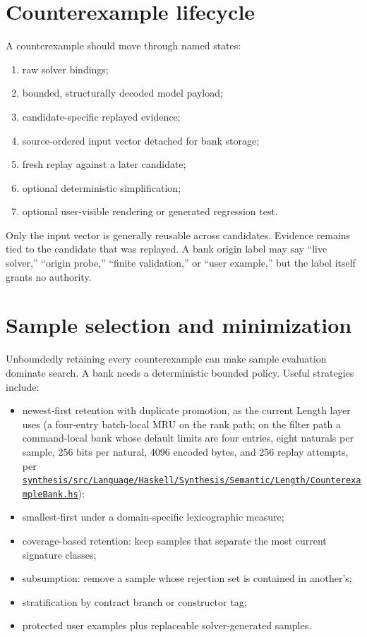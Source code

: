 \documentclass[10pt,letterpaper,oneside]{report}
\def\DjexPinnedCommit{7d65eba6f753727ae7b3d734fb4a7e00f1f44aa7}
\def\DjexBase{https://github.com/VladimirReshetnikov/Djex/blob/\DjexPinnedCommit/}
\newcommand{\dpath}[1]{\href{\DjexBase#1}{\nolinkurl{#1}}}
\begin{document}
\section{Counterexample lifecycle}

A counterexample should move through named states:

\begin{enumerate}
\item raw solver bindings;
\item bounded, structurally decoded model payload;
\item candidate-specific replayed evidence;
\item source-ordered input vector detached for bank storage;
\item fresh replay against a later candidate;
\item optional deterministic simplification;
\item optional user-visible rendering or generated regression test.
\end{enumerate}

Only the input vector is generally reusable across candidates. Evidence remains tied to the candidate that was replayed. A bank origin label may say ``live solver,'' ``origin probe,'' ``finite validation,'' or ``user example,'' but the label itself grants no authority.

\section{Sample selection and minimization}

Unboundedly retaining every counterexample can make sample evaluation dominate search. A bank needs a deterministic bounded policy. Useful strategies include:

\begin{itemize}
\item newest-first retention with duplicate promotion, as the current Length layer uses (a four-entry batch-local MRU on the rank path; on the filter path a command-local bank whose default limits are four entries, eight naturals per sample, 256 bits per natural, 4096 encoded bytes, and 256 replay attempts, per \dpath{synthesis/src/Language/Haskell/Synthesis/Semantic/Length/CounterexampleBank.hs});
\item smallest-first under a domain-specific lexicographic measure;
\item coverage-based retention: keep samples that separate the most current signature classes;
\item subsumption: remove a sample whose rejection set is contained in another's;
\item stratification by contract branch or constructor tag;
\item protected user examples plus replaceable solver-generated samples.
\end{itemize}
\end{document}
